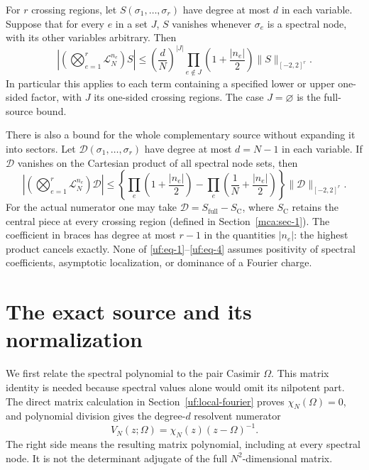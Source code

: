 For \(r\) crossing regions, let \(S(\sigma_1,\ldots,\sigma_r)\) have
degree at most \(d\) in each variable. Suppose that for every \(e\) in a
set \(J\), \(S\) vanishes whenever \(\sigma_e\) is a spectral node, with
its other variables arbitrary. Then \begin{equation}\label{uf:eq-3}
\left|\left(\bigotimes_{e=1}^r\mathcal L_N^{n_e}\right)S\right|
 \le \left(\frac dN\right)^{|J|}
       \prod_{e\notin J}\left(1+\frac{|n_e|}{2}\right)
                          \|S\|_{[-2,2]^r}.
\end{equation} In particular this applies to each term containing a specified lower
or upper one-sided factor, with \(J\) its one-sided crossing regions.
The case \(J=\varnothing\) is the full-source bound.

There is also a bound for the whole complementary source without
expanding it into sectors. Let
\(\mathcal D(\sigma_1,\ldots,\sigma_r)\) have degree at most
\(d=N-1\) in each variable. If \(\mathcal D\) vanishes on the Cartesian
product of all spectral node sets, then \begin{equation}\label{uf:eq-4}
\left|\left(\bigotimes_{e=1}^r\mathcal L_N^{n_e}\right)\mathcal D\right|
 \le \left\{\prod_e\left(1+\frac{|n_e|}{2}\right)
       -\prod_e\left(\frac1N+\frac{|n_e|}{2}\right)\right\}
                         \|\mathcal D\|_{[-2,2]^r}.
\end{equation} For the actual numerator one may take
\(\mathcal D=S_{\mathrm{full}}-S_{\mathrm C}\), where
\(S_{\mathrm C}\) retains the central piece at every crossing region
(defined in Section~\ref{mca:sec-1}). The coefficient in
braces has degree at most \(r-1\) in the quantities \(|n_e|\): the
highest product cancels exactly. None of \eqref{uf:eq-1}--\eqref{uf:eq-4} assumes positivity of
spectral coefficients, asymptotic localization, or dominance of a
Fourier charge.

\section{The exact source and its
normalization}\label{uf:sec-the-exact-source-and-its-normalization}

We first relate the spectral polynomial to the pair Casimir
\(\Omega\). This matrix identity is needed because spectral values
alone would omit its nilpotent part. The direct matrix calculation in
Section~\ref{uf:local-fourier} proves \(\chi_N(\Omega)=0\), and
polynomial division gives the degree-\(d\) resolvent numerator \begin{equation}\label{uf:eq-5}
V_N(z;\Omega)=\chi_N(z)(z-\Omega)^{-1}.
\end{equation} The right side means the resulting matrix polynomial, including at
every spectral node. It is not the determinant adjugate of the full
\(N^2\)-dimensional matrix.

